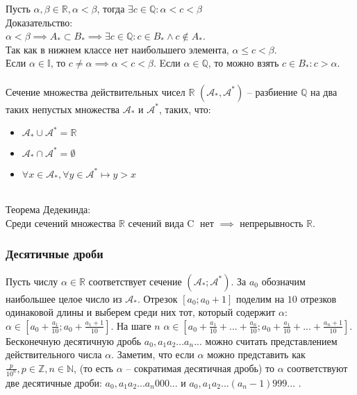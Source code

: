 \documentclass{article}
\begin{document}
        Пусть $\alpha, \beta \in \mathbb{R}, \alpha < \beta$, тогда $\exists c \in \mathbb{Q}: \alpha < c < \beta$
        \\
        Доказательство:
        \\
        $\alpha < \beta \implies A_* \subset B_* \implies \exists c \in \mathbb{Q}: c \in B_* \wedge c \notin A_*$.
        \\
        Так как в нижнем классе нет наибольшего элемента, $\alpha \le c < \beta$.
        \\
        Если $\alpha \in \mathbb{I}$, то $c \neq \alpha \implies \alpha < c < \beta$.
        Eсли $\alpha \in \mathbb{Q}$, то можно взять $c \in B_*: c > \alpha$. 
        \\
        \\
        Сечение множества действительных чисел $\mathbb{R}$ $(\mathcal{A_*}, \mathcal{A^*})$ --
        разбиение $\mathbb{Q}$ на два таких непустых множества $\mathcal{A_*}$ и $\mathcal{A^*}$, таких, что:
        \begin{itemize}
            \item $\mathcal{A_*} \cup \mathcal{A^*} = \mathbb{R}$
            \item $\mathcal{A_*} \cap \mathcal{A^*} = \emptyset$
            \item $\forall x \in \mathcal{A_*}, \forall y \in \mathcal{A^*} \longmapsto y > x$
        \end{itemize}
        \mbox{}
        \\
        Теорема Дедекинда:
        \\
        Среди сечений множества $\mathbb{R}$ сечений вида {\large \textcircled{\small C}} нет $\implies$ непрерывность $\mathbb{R}$.

        \subsubsection*{Десятичные дроби}
        Пусть числу $\alpha \in \mathbb{R}$ соответствует сечение $(\mathcal{A_*};\mathcal{A^*})$. За $a_0$ обозначим наибольшее целое число из $\mathcal{A_*}$.
        Отрезок $[a_0;a_0 + 1]$ поделим на $10$ отрезков одинаковой длины и выберем среди них тот, который содержит $\alpha$:
        $\alpha \in [a_0 + \frac{a_1}{10};a_0 + \frac{a_1 + 1}{10}]$.
        На шаге $n$ $\alpha \in [a_0 + \frac{a_1}{10} + ... + \frac{a_n}{10};a_0 + \frac{a_1}{10} + ... + \frac{a_n + 1}{10}]$.
        Бесконечную десятичную дробь $a_0,a_1a_2...a_n...$ можно считать представлением действительного числа $\alpha$.
        Заметим, что если $\alpha$ можно представить как $\frac{p}{10^n}, p \in \mathbb{Z}, n \in \mathbb{N}$, (то есть $\alpha$ -- сократимая десятичная дробь)
        то $\alpha$ соответствуют две десятичные дроби: $a_0,a_1a_2...a_n000...$ и $a_0,a_1a_2...(a_n - 1)999...$ .
        
\end{document}
